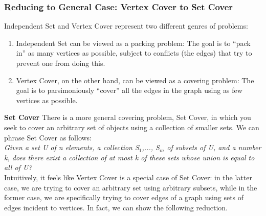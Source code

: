 \documentclass{article}
\begin{document}



\subsubsection{Reducing to General Case: Vertex Cover to Set Cover} Independent Set and Vertex Cover represent two different genres of problems:

\begin{enumerate}
    \item Independent Set can be viewed as a packing problem: The goal is to “pack in” as many vertices as possible, subject to conflicts (the edges) that try to prevent one from doing this.
    \item Vertex Cover, on the other hand, can be viewed as a covering problem: The goal is to parsimoniously “cover” all the edges in the graph using as few vertices as possible.
\end{enumerate}

\textbf{Set Cover} There is a more general covering problem, Set Cover, in which you seek to cover an arbitrary set of objects using a collection of smaller sets. We can phrase Set Cover as follows:\\

\emph{Given a set U of n elements, a collection S$_1$,..., S$_m$ of subsets of U, and a number k, does there exist a collection of at most k of these sets whose union is equal to all of U?}\\

Intuitively, it feels like Vertex Cover is a special case of Set Cover: in the latter case, we are trying to cover an arbitrary set using arbitrary subsets, while in the former case, we are specifically trying to cover edges of a graph using sets of edges incident to vertices. In fact, we can show the following reduction.\\

\\
\end{document}
